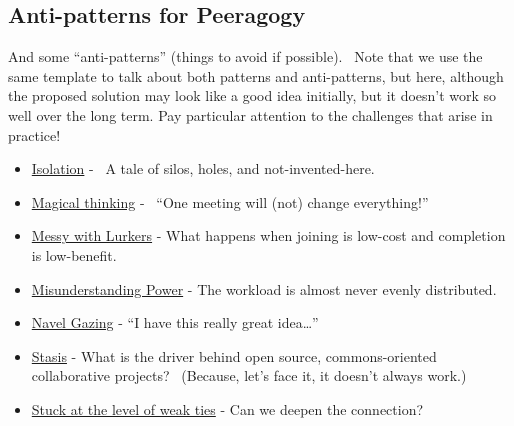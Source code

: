 \subsection{Anti-patterns for Peeragogy}

And some ``anti-patterns'' (things to avoid if possible).~ Note that we
use the same template to talk about both patterns and anti-patterns, but
here, although the proposed solution may look like a good idea
initially, but it doesn't work so well over the long term. Pay
particular attention to the challenges that arise in practice!

\begin{itemize}
\itemsep1pt\parskip0pt
\item
  \href{http://peeragogy.org/antipatterns/isolation/}{Isolation} -~ A
  tale of silos, holes, and not-invented-here.
\item
  \href{http://peeragogy.org/antipatterns/magical-thinking/}{Magical
  thinking} - ~``One meeting will (not) change everything!''
\item
  \href{http://peeragogy.org/antipatterns/co-learning-messy-with-lurkers/}{Messy
  with Lurkers} - What happens when joining is low-cost and completion
  is low-benefit.
\item
  \href{http://peeragogy.org/antipatterns/misunderstanding-power/}{Misunderstanding
  Power} - The workload is almost never evenly distributed.
\item
  \href{http://peeragogy.org/antipatterns/navel-gazing/}{Navel Gazing} -
  ``I have this really great idea\ldots{}''
\item
  \href{http://peeragogy.org/antipatterns/stasis/}{Stasis} - What is the
  driver behind open source, commons-oriented collaborative projects?~
  (Because, let's face it, it doesn't always work.)
\item
  \href{http://peeragogy.org/antipatterns/stuck-at-the-level-of-weak-ties/}{Stuck
  at the level of weak ties} - Can we deepen the connection?
\end{itemize}



